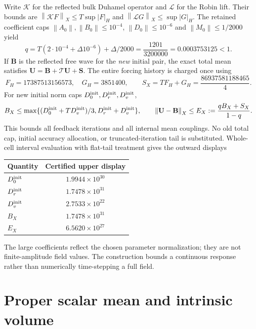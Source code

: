 \documentclass[11pt]{article}
\newcommand{\norm}[1]{\left\lVert #1\right\rVert}
\begin{document}
Write $\mathcal K$ for the reflected bulk Duhamel operator and
$\mathcal L$ for the Robin lift. Their bounds are
$\norm{\mathcal KF}_X\le T\sup|F|_H$ and
$\norm{\mathcal LG}_X\le\sup|G|_H$.
The retained coefficient caps
$\norm{A_0},\norm{B_0}\le10^{-4}$,
$\norm{D_0}\le10^{-6}$ and $\norm{M_0}\le1/2000$ yield
\begin{equation}
 q=T(2\cdot10^{-4}+\Delta10^{-6})+\Delta/2000
   =\frac{1201}{3200000}=0.0003753125<1. \label{eq:q}
\end{equation}
If $\mathbf B$ is the reflected free wave for the \emph{new} initial
pair, the exact total mean satisfies
$\mathbf U=\mathbf B+\mathcal T\mathbf U+\mathbf S$.
The entire forcing history is charged once using
\begin{equation}
 F_H=17387513156573,\quad G_H=3851400,\qquad
 S_X=TF_H+G_H=\frac{86937581188465}{4}. \label{eq:sourcecap}
\end{equation}
For new initial norm caps $D_0^{\rm init},D_r^{\rm init},D_v^{\rm init}$,
\begin{equation}
 B_X\le\max\{(D_0^{\rm init}+TD_v^{\rm init})/3,
                    D_r^{\rm init}+D_v^{\rm init}\},\qquad
 \norm{\mathbf U-\mathbf B}_X\le E_X:=\frac{qB_X+S_X}{1-q}.
 \label{eq:resolvent}
\end{equation}
This bounds all feedback iterations and all internal mean couplings.
No old total cap, initial accuracy allocation, or truncated-iteration tail
is substituted. Whole-cell interval evaluation with flat-tail treatment
gives the outward displays
\begin{center}
\begin{tabular}{@{}lc@{}}\toprule
Quantity & Certified upper display\\\midrule
$D_0^{\rm init}$ & $1.9944\times10^{30}$\\
$D_r^{\rm init}$ & $1.7478\times10^{31}$\\
$D_v^{\rm init}$ & $2.7533\times10^{22}$\\
$B_X$ & $1.7478\times10^{31}$\\
$E_X$ & $6.5620\times10^{27}$\\\bottomrule
\end{tabular}
\end{center}
The large coefficients reflect the chosen parameter normalization; they
are not finite-amplitude field values. The construction bounds a
continuous response rather than numerically time-stepping a full field.

\section{Proper scalar mean and intrinsic volume}\label{sec:proper}
\end{document}
